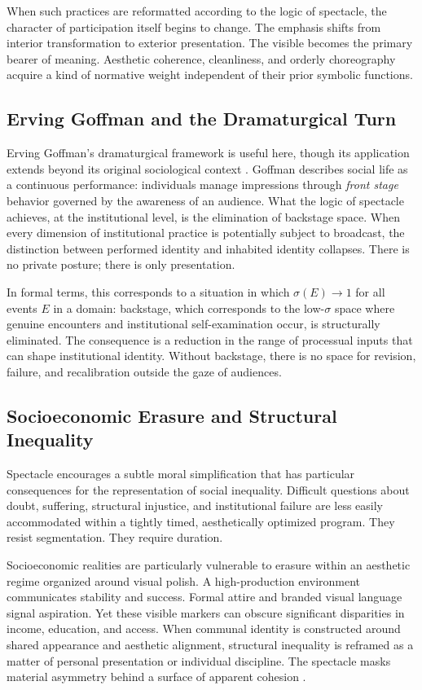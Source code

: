 \documentclass[12pt]{article}
\theoremstyle{definition}
\theoremstyle{plain}
\begin{document}
When such practices are reformatted according to the logic of spectacle, the character of participation itself begins to change. The emphasis shifts from interior transformation to exterior presentation. The visible becomes the primary bearer of meaning. Aesthetic coherence, cleanliness, and orderly choreography acquire a kind of normative weight independent of their prior symbolic functions.

\subsection{Erving Goffman and the Dramaturgical Turn}

Erving Goffman's dramaturgical framework is useful here, though its application extends beyond its original sociological context \citep{Goffman1959}. Goffman describes social life as a continuous performance: individuals manage impressions through \emph{front stage} behavior governed by the awareness of an audience. What the logic of spectacle achieves, at the institutional level, is the elimination of backstage space. When every dimension of institutional practice is potentially subject to broadcast, the distinction between performed identity and inhabited identity collapses. There is no private posture; there is only presentation.

In formal terms, this corresponds to a situation in which $\sigma(E) \to 1$ for all events $E$ in a domain: backstage, which corresponds to the low-$\sigma$ space where genuine encounters and institutional self-examination occur, is structurally eliminated. The consequence is a reduction in the range of processual inputs that can shape institutional identity. Without backstage, there is no space for revision, failure, and recalibration outside the gaze of audiences.

\subsection{Socioeconomic Erasure and Structural Inequality}

Spectacle encourages a subtle moral simplification that has particular consequences for the representation of social inequality. Difficult questions about doubt, suffering, structural injustice, and institutional failure are less easily accommodated within a tightly timed, aesthetically optimized program. They resist segmentation. They require duration.

Socioeconomic realities are particularly vulnerable to erasure within an aesthetic regime organized around visual polish. A high-production environment communicates stability and success. Formal attire and branded visual language signal aspiration. Yet these visible markers can obscure significant disparities in income, education, and access. When communal identity is constructed around shared appearance and aesthetic alignment, structural inequality is reframed as a matter of personal presentation or individual discipline. The spectacle masks material asymmetry behind a surface of apparent cohesion \citep{Bourdieu1984}.
\end{document}
